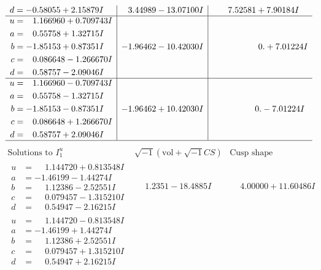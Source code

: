 \documentclass[1p]{elsarticle_modified}
\theoremstyle{definition}
\newcommand{\I}{\sqrt{-1}}
\begin{document}
$$\begin{array}{c|c|c}
\begin{aligned}
d &= -0.58055 + 2.15879 I\end{aligned}
 & \phantom{-}3.44989 - 13.07100 I & \phantom{-}7.52581 + 7.90184 I \\ \hline\begin{aligned}
u &= \phantom{-}1.166960 + 0.709743 I \\
a &= \phantom{-}0.55758 + 1.32715 I \\
b &= -1.85153 + 0.87351 I \\
c &= \phantom{-}0.086648 - 1.266670 I \\
d &= \phantom{-}0.58757 - 2.09046 I\end{aligned}
 & -1.96462 - 10.42030 I & \phantom{-0.000000 -}0. + 7.01224 I \\ \hline\begin{aligned}
u &= \phantom{-}1.166960 - 0.709743 I \\
a &= \phantom{-}0.55758 - 1.32715 I \\
b &= -1.85153 - 0.87351 I \\
c &= \phantom{-}0.086648 + 1.266670 I \\
d &= \phantom{-}0.58757 + 2.09046 I\end{aligned}
 & -1.96462 + 10.42030 I & \phantom{-0.000000 } 0. - 7.01224 I\\
 \hline 
 \end{array}$$\newpage$$\begin{array}{c|c|c}  
\text{Solutions to }I^u_{1}& \I (\text{vol} + \sqrt{-1}CS) & \text{Cusp shape}\\
 \hline 
\begin{aligned}
u &= \phantom{-}1.144720 + 0.813548 I \\
a &= -1.46199 - 1.44274 I \\
b &= \phantom{-}1.12386 - 2.52551 I \\
c &= \phantom{-}0.079457 - 1.315210 I \\
d &= \phantom{-}0.54947 - 2.16215 I\end{aligned}
 & \phantom{-}1.2351 - 18.4885 I & \phantom{-}4.00000 + 11.60486 I \\ \hline\begin{aligned}
u &= \phantom{-}1.144720 - 0.813548 I \\
a &= -1.46199 + 1.44274 I \\
b &= \phantom{-}1.12386 + 2.52551 I \\
c &= \phantom{-}0.079457 + 1.315210 I \\
d &= \phantom{-}0.54947 + 2.16215 I\end{aligned}

\end{array}$$
\end{document}
